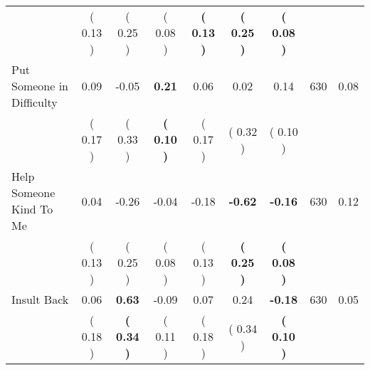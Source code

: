 \begin{tabular}{lcccccccc}
 & (     0.13 ) & (     0.25 ) & (     0.08 ) & \textbf{(     0.13 )} & \textbf{(     0.25 )} & \textbf{(     0.08 )} & \\
Put Someone in Difficulty &      0.09 &     -0.05 & \textbf{     0.21} &      0.06 &      0.02 &      0.14 & 630 &       0.08 \\ 
 & (     0.17 ) & (     0.33 ) & \textbf{(     0.10 )} & (     0.17 ) & (     0.32 ) & (     0.10 ) & \\
Help Someone Kind To Me &      0.04 &     -0.26 &     -0.04 &     -0.18 & \textbf{    -0.62} & \textbf{    -0.16} & 630 &       0.12 \\ 
 & (     0.13 ) & (     0.25 ) & (     0.08 ) & (     0.13 ) & \textbf{(     0.25 )} & \textbf{(     0.08 )} & \\
Insult Back &      0.06 & \textbf{     0.63} &     -0.09 &      0.07 &      0.24 & \textbf{    -0.18} & 630 &       0.05 \\ 
 & (     0.18 ) & \textbf{(     0.34 )} & (     0.11 ) & (     0.18 ) & (     0.34 ) & \textbf{(     0.10 )} & \\
\bottomrule
\end{tabular}
